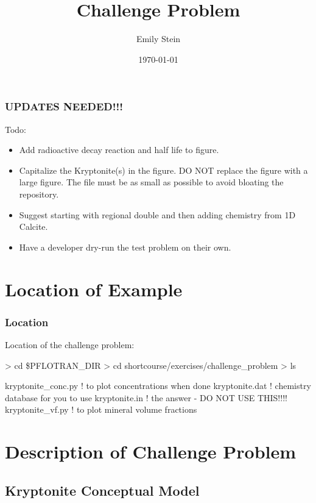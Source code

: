 \documentclass{beamer}
\newcommand\bluecomment[1]{{{\color{blue} #1}}}
\begin{document}
\title{Challenge Problem}
\author{Emily Stein}
\date{\today}


\begin{frame}\frametitle{\color{red}UPDATES NEEDED!!!}
Todo:
\begin{itemize}
  \item Add radioactive decay reaction and half life to figure.
  \item Capitalize the Kryptonite(s) in the figure. {\color{red}DO NOT replace the figure with a large figure. The file must be as small as possible to avoid bloating the repository.}
  \item Suggest starting with regional double and then adding chemistry from 1D Calcite.
  \item Have a developer dry-run the test problem on their own.
\end{itemize}

\end{frame}

\section{Location of Example}

\begin{frame}\frametitle{Location}

Location of the challenge problem:

\begin{semiverbatim}
> cd \$PFLOTRAN_DIR
> cd shortcourse/exercises/challenge_problem
> ls

kryptonite_conc.py \bluecomment{! to plot concentrations when done}
kryptonite.dat     \bluecomment{! chemistry database for you to use}
kryptonite.in      \bluecomment{! the answer - DO NOT USE THIS!!!!}
kryptonite_vf.py   \bluecomment{! to plot mineral volume fractions}
\end{semiverbatim}

\end{frame}

\section{Description of Challenge Problem}

\subsection{Kryptonite Conceptual Model}
\end{document}
